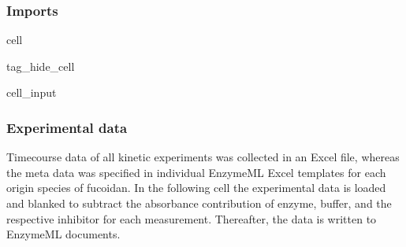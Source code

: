 \documentclass[letterpaper,10pt,english]{jupyterBook}
\begin{document}
\subsubsection{Imports}
\label{\detokenize{scenarios/glycosidase_inhibition:imports}}
\begin{sphinxuseclass}{cell}
\begin{sphinxuseclass}{tag_hide_cell}\begin{sphinxVerbatimInput}

\begin{sphinxuseclass}{cell_input}
\begin{sphinxVerbatim}[commandchars=\\\{\}]
   
   
   
   
   
 
 
   
   
   


 

  
\end{sphinxVerbatim}

\end{sphinxuseclass}\end{sphinxVerbatimInput}

\end{sphinxuseclass}
\end{sphinxuseclass}

\subsubsection{Experimental data}
\label{\detokenize{scenarios/glycosidase_inhibition:experimental-data}}
\sphinxAtStartPar
Time\sphinxhyphen{}course data of all kinetic experiments was collected in an Excel file, whereas the meta data was specified in individual EnzymeML Excel templates for each origin species of fucoidan. In the following cell the experimental data is loaded and blanked to subtract the absorbance contribution of enzyme, buffer, and the respective inhibitor for each measurement. Thereafter, the data is written to EnzymeML documents.
\end{document}
